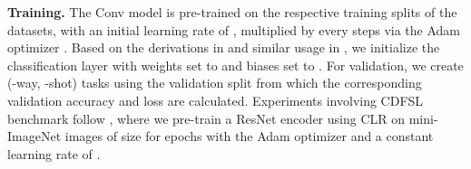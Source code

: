 \documentclass{article}
\begin{document}
\textbf{Training.} The Conv model \citep{Vinyals2016MatchingLearning} is pre-trained on the respective training splits of the datasets, with an initial learning rate of , multiplied by  every  steps via the Adam optimizer \citep{kingma2014adam}. Based on the derivations in \citep{Snell2017PrototypicalLearning} and similar usage in \citep{Medina2020Self-SupervisedClassification}, we initialize the classification layer  with weights set to  and biases set to . For validation, we create  (-way, -shot) tasks using the validation split from which the corresponding validation accuracy and loss are calculated. Experiments involving CDFSL benchmark follow \citep{guo2019new, Medina2020Self-SupervisedClassification}, where we pre-train a ResNet encoder using CLR on mini-ImageNet images of size  for  epochs with the Adam optimizer and a constant learning rate of .
\end{document}
